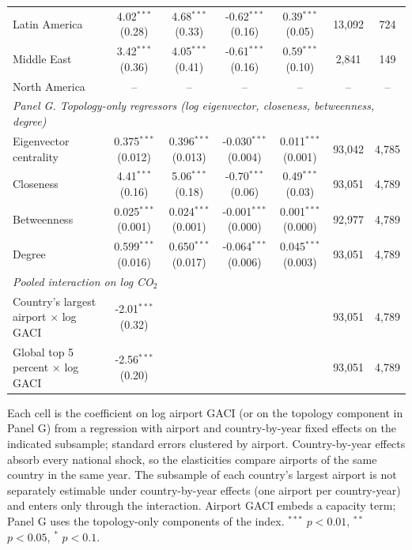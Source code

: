 \documentclass[12pt]{article}
\begin{document}
\begin{table}[htbp]
\begin{threeparttable}
\begin{tabular}{lcccccc}
  Latin America & 4.02$^{***}$ (0.28) & 4.68$^{***}$ (0.33) & -0.62$^{***}$ (0.16) & 0.39$^{***}$ (0.05) & 13,092 & 724 \\
  Middle East & 3.42$^{***}$ (0.36) & 4.05$^{***}$ (0.41) & -0.61$^{***}$ (0.16) & 0.59$^{***}$ (0.10) & 2,841 & 149 \\
  North America & -- & -- & -- & -- & -- & -- \\
\multicolumn{7}{l}{\textit{Panel G. Topology-only regressors (log eigenvector, closeness, betweenness, degree)}} \\
  Eigenvector centrality & 0.375$^{***}$ (0.012) & 0.396$^{***}$ (0.013) & -0.030$^{***}$ (0.004) & 0.011$^{***}$ (0.001) & 93,042 & 4,785 \\
  Closeness & 4.41$^{***}$ (0.16) & 5.06$^{***}$ (0.18) & -0.70$^{***}$ (0.06) & 0.49$^{***}$ (0.03) & 93,051 & 4,789 \\
  Betweenness & 0.025$^{***}$ (0.001) & 0.024$^{***}$ (0.001) & -0.001$^{***}$ (0.000) & 0.001$^{***}$ (0.000) & 92,977 & 4,789 \\
  Degree & 0.599$^{***}$ (0.016) & 0.650$^{***}$ (0.017) & -0.064$^{***}$ (0.006) & 0.045$^{***}$ (0.003) & 93,051 & 4,789 \\
\midrule
\multicolumn{7}{l}{\textit{Pooled interaction on log CO$_2$}} \\
  Country's largest airport $\times$ log GACI & -2.01$^{***}$ (0.32) & & & & 93,051 & 4,789 \\
  Global top 5 percent $\times$ log GACI & -2.56$^{***}$ (0.20) & & & & 93,051 & 4,789 \\
\bottomrule
\end{tabular}
\begin{tablenotes}\scriptsize
\item Each cell is the coefficient on log airport GACI (or on the topology component in Panel G) from a regression with airport and country-by-year fixed effects on the indicated subsample; standard errors clustered by airport. Country-by-year effects absorb every national shock, so the elasticities compare airports of the same country in the same year. The subsample of each country's largest airport is not separately estimable under country-by-year effects (one airport per country-year) and enters only through the interaction. Airport GACI embeds a capacity term; Panel G uses the topology-only components of the index. $^{***}$ $p<0.01$, $^{**}$ $p<0.05$, $^{*}$ $p<0.1$.
\end{tablenotes}
\end{threeparttable}
\end{table}
\end{document}

